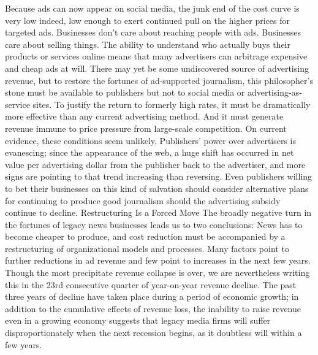 Because ads can now appear on social media, the junk end of the cost curve is
very low indeed, low enough to exert continued pull on the higher prices for
targeted ads. Businesses don’t care about reaching people with ads. Businesses
care about selling things. The ability to understand who actually buys their products
or services online means that many advertisers can arbitrage expensive and
cheap ads at will.
There may yet be some undiscovered source of advertising revenue, but to restore
the fortunes of ad-supported journalism, this philosopher’s stone must be available
to publishers but not to social media or advertising-as-service sites. To justify
the return to formerly high rates, it must be dramatically more effective than any
current advertising method. And it must generate revenue immune to price pressure
from large-scale competition.
On current evidence, these conditions seem unlikely. Publishers’ power over
advertisers is evanescing; since the appearance of the web, a huge shift has occurred
in net value per advertising dollar from the publisher back to the advertiser, and
more signs are pointing to that trend increasing than reversing. Even publishers
willing to bet their businesses on this kind of salvation should consider alternative
plans for continuing to produce good journalism should the advertising subsidy
continue to decline.
Restructuring Is a Forced Move
The broadly negative turn in the fortunes of legacy news businesses leads us to
two conclusions: News has to become cheaper to produce, and cost reduction
must be accompanied by a restructuring of organizational models and processes.
Many factors point to further reductions in ad revenue and few point to increases
in the next few years. Though the most precipitate revenue collapse is over, we
are nevertheless writing this in the 23rd consecutive quarter of year-on-year
revenue decline. The past three years of decline have taken place during a period
of economic growth; in addition to the cumulative effects of revenue loss, the
inability to raise revenue even in a growing economy suggests that legacy media
firms will suffer disproportionately when the next recession begins, as it doubtless
will within a few years.

